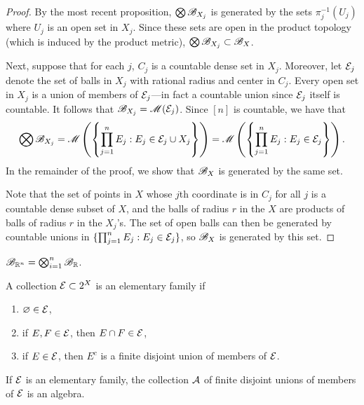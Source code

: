 \documentclass[12pt]{article} %
\begin{document}
\begin{proof}
    By the most recent proposition, $\bigotimes \mathscr{B}_{X_j}$ is generated by the sets $\pi_{j}^{-1}(U_j)$ where $U_j$ is an open set in $X_j$. Since these sets are open in the product topology (which is induced by the product metric), $\bigotimes \mathscr{B}_{X_j} \subset \mathscr{B}_X$.

    Next, suppose that for each $j$, $C_j$ is a countable dense set in $X_j$. Moreover, let $\mathcal{E}_j$ denote the set of balls in $X_j$ with rational radius and center in $C_j$. Every open set in $X_j$ is a union of members of $\mathcal{E}_j$---in fact a countable union since $\mathcal{E}_j$ itself is countable. It follows that $\mathscr{B}_{X_j} = \mathscr{M}(\mathcal{E}_j)$. Since $[n]$ is countable, we have that \[\bigotimes \mathscr{B}_{X_j} = \mathscr{M}\left(\left\{\prod_{j=1}^{n} E_j : E_j \in \mathcal{E}_j \cup X_j\right\}\right) = \mathscr{M}\left(\left\{\prod_{j=1}^{n} E_j : E_j \in \mathcal{E}_j\right\}\right).\] In the remainder of the proof, we show that $\mathscr{B}_X$ is generated by the same set.

    Note that the set of points in $X$ whose $j$th coordinate is in $C_j$ for all $j$ is a countable dense subset of $X$, and the balls of radius $r$ in the $X$ are products of balls of radius $r$ in the $X_j$'s. The set of open balls can then be generated by countable unions in $\{\prod_{j=1}^{n} E_j : E_j \in \mathcal{E}_j \}$, so $\mathscr{B}_X$ is generated by this set.
\end{proof}

\begin{corollary}
    $\mathscr{B}_{\mathbb{R}^n} = \bigotimes_{i=1}^{n} \mathscr{B}_{\mathbb{R}}$.
\end{corollary}

\begin{definition}
    A collection $\mathcal{E} \subset 2^X$ is an elementary family if \begin{enumerate}
        \item $\varnothing \in \mathcal{E}$,
        \item if $E, F \in \mathcal{E}$, then $E \cap F \in \mathcal{E}$,
        \item if $E \in \mathcal{E}$, then $E^c$ is a finite disjoint union of members of $\mathcal{E}$.
    \end{enumerate}
\end{definition}

\begin{proposition}
    If $\mathcal{E}$ is an elementary family, the collection $\mathcal{A}$ of finite disjoint unions of members of $\mathcal{E}$ is an algebra.
\end{proposition}
\end{document}
